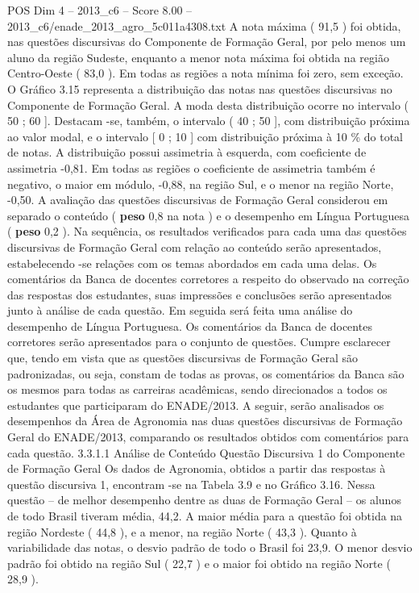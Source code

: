 \begin{textsample}{POS Dim 4 – 2013\_c6 – Score 8.00 – 2013\_c6/enade\_2013\_agro\_5c011a4308.txt}
A nota máxima ( 91,5 ) foi obtida, nas questões discursivas do Componente de Formação Geral, por pelo menos um aluno da região Sudeste, enquanto a menor nota máxima foi obtida na região Centro-Oeste ( 83,0 ).
Em todas as regiões a nota mínima foi zero, sem exceção.
O Gráfico 3.15 representa a distribuição das notas nas questões discursivas no Componente de Formação Geral.
A moda desta distribuição ocorre no intervalo ( 50 ; 60 ].
Destacam -se, também, o intervalo ( 40 ; 50 ], com distribuição próxima ao valor modal, e o intervalo [ 0 ; 10 ] com distribuição próxima à 10 \% do total de notas.
A distribuição possui assimetria à esquerda, com coeficiente de assimetria -0,81.
Em todas as regiões o coeficiente de assimetria também é negativo, o maior em módulo, -0,88, na região Sul, e o menor na região Norte, -0,50.
A avaliação das questões discursivas de Formação Geral considerou em separado o conteúdo ( \textbf{peso} 0,8 na nota ) e o desempenho em Língua Portuguesa ( \textbf{peso} 0,2 ).
Na sequência, os resultados verificados para cada uma das questões discursivas de Formação Geral com relação ao conteúdo serão apresentados, estabelecendo -se relações com os temas abordados em cada uma delas.
Os comentários da Banca de docentes corretores a respeito do observado na correção das respostas dos estudantes, suas impressões e conclusões serão apresentados junto à análise de cada questão.
Em seguida será feita uma análise do desempenho de Língua Portuguesa.
Os comentários da Banca de docentes corretores serão apresentados para o conjunto de questões.
Cumpre esclarecer que, tendo em vista que as questões discursivas de Formação Geral são padronizadas, ou seja, constam de todas as provas, os comentários da Banca são os mesmos para todas as carreiras acadêmicas, sendo direcionados a todos os estudantes que participaram do ENADE/2013.
A seguir, serão analisados os desempenhos da Área de Agronomia nas duas questões discursivas de Formação Geral do ENADE/2013, comparando os resultados obtidos com comentários para cada questão. 3.3.1.1 Análise de Conteúdo Questão Discursiva 1 do Componente de Formação Geral Os dados de Agronomia, obtidos a partir das respostas à questão discursiva 1, encontram -se na Tabela 3.9 e no Gráfico 3.16.
Nessa questão – de melhor desempenho dentre as duas de Formação Geral – os alunos de todo Brasil tiveram média, 44,2.
A maior média para a questão foi obtida na região Nordeste ( 44,8 ), e a menor, na região Norte ( 43,3 ).
Quanto à variabilidade das notas, o desvio padrão de todo o Brasil foi 23,9.
O menor desvio padrão foi obtido na região Sul ( 22,7 ) e o maior foi obtido na região Norte ( 28,9 ).

\end{textsample}
